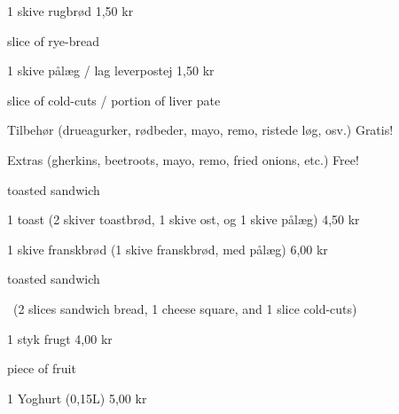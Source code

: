 \documentclass{article}
\begin{document}

\maketitle

\null
\vspace{-0.8cm}


\vspace{0.5cm}

1 skive rugbrød \hfill 1,50 kr

{ slice of rye-bread}

\vspace{0.3cm}

1 skive pålæg / lag leverpostej \hfill 1,50 kr

{ slice of cold-cuts / portion of liver pate}

\vspace{0.3cm}

Tilbehør {\large (drueagurker, rødbeder, mayo, remo, ristede løg, osv.)}
\hfill Gratis!

{\english Extras \large (gherkins, beetroots, mayo, remo, fried onions, etc.)}
\hfill  {\english Free!}

{ toasted sandwich}

\vspace{0.3cm}

1 toast {\large (2 skiver toastbrød, 1 skive ost, og 1 skive pålæg)}
\hfill 4,50 kr

\vspace{0.3cm}

1 skive franskbrød {\large (1 skive franskbrød, med pålæg)}
\hfill 6,00 kr

{ toasted sandwich}

\vspace{-0.1cm}

{\english\large\quad\ (2 slices sandwich bread, 1 cheese square, and 1 slice
cold-cuts)}

\vspace{0.3cm}

1 styk frugt
\hfill 4,00 kr

{ piece of fruit}

\vspace{0.3cm}

1 Yoghurt (0,15L)
\hfill 5,00 kr

\vspace{0.3cm}
\end{document}
